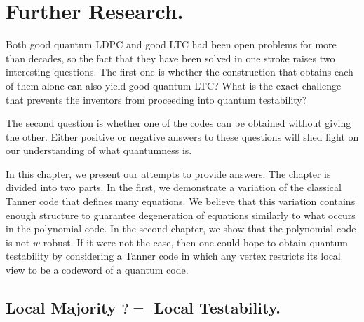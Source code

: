 
\chapter{Further Research.}
Both good quantum LDPC and good LTC had been open problems for more than decades, so the fact that they have been solved in one stroke raises two interesting questions. The first one is whether the construction that obtains each of them alone can also yield good quantum LTC? What is the exact challenge that prevents the inventors from proceeding into quantum testability?

The second question is whether one of the codes can be obtained without giving the other. Either positive or negative answers to these questions will shed light on our understanding of what quantumness is.

In this chapter, we present our attempts to provide answers. The chapter is divided into two parts. In the first, we demonstrate a variation of the classical Tanner code that defines many equations. We believe that this variation contains enough structure to guarantee degeneration of equations similarly to what occurs in the polynomial code. In the second chapter, we show that the polynomial code is not $w$-robust. If it were not the case, then one could hope to obtain quantum testability by considering a Tanner code in which any vertex restricts its local view to be a codeword of a quantum code.



\section{Local Majority $?=$ Local Testability.}




